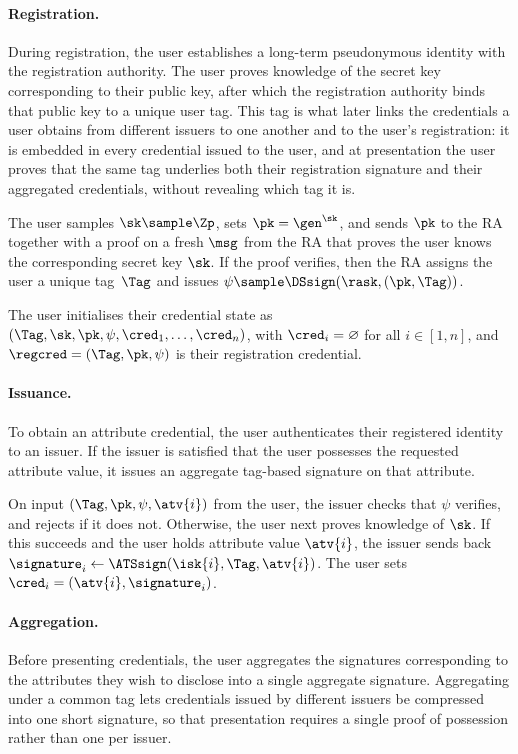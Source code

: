 \paragraph{Registration.} During registration, the user establishes a long-term
pseudonymous identity with the registration authority. The user proves knowledge
of the secret key corresponding to their public key, after which the
registration authority binds that public key to a unique user tag. This tag is
what later links the credentials a user obtains from different issuers to one
another and to the user's registration: it is embedded in every credential
issued to the user, and at presentation the user proves that the same tag
underlies both their registration signature and their aggregated credentials,
without revealing which tag it is.

The user samples $\sk \sample \Zp$, sets $\pk = \gen^{\sk}$, and sends $\pk$ to
the RA together with a proof on a fresh $\msg$ from the RA that proves the user
knows the corresponding secret key $\sk$.  If the proof verifies, then the RA
assigns the user a unique tag~$\Tag$ and issues $\psi \sample \DSsign(\rask,
(\pk, \Tag))$.

The user initialises their credential state as $(\Tag, \sk, \pk, \psi, \cred_1,
\ldots, \cred_n)$, with $\cred_i = \varnothing$ for all $i \in [1,n]$, and
$\regcred = (\Tag, \pk, \psi)$ is their registration credential.

\paragraph{Issuance.} To obtain an attribute credential, the user authenticates
their registered identity to an issuer. If the issuer is satisfied that the user
possesses the requested attribute value, it issues an aggregate tag-based
signature on that attribute.

On input $(\Tag, \pk, \psi, \atv{i})$ from the user, the issuer checks that
$\psi$ verifies, and rejects if it does not.  Otherwise, the user next proves
knowledge of $\sk$.  If this succeeds and the user holds attribute value
$\atv{i}$, the issuer sends back $\signature_i \leftarrow \ATSsign(\isk{i},
\Tag, \atv{i})$. The user sets $\cred_i = (\atv{i}, \signature_i)$.

\paragraph{Aggregation.} Before presenting credentials, the user aggregates the
signatures corresponding to the attributes they wish to disclose into a single
aggregate signature. Aggregating under a common tag lets credentials issued by
different issuers be compressed into one short signature, so that presentation
requires a single proof of possession rather than one per issuer.

